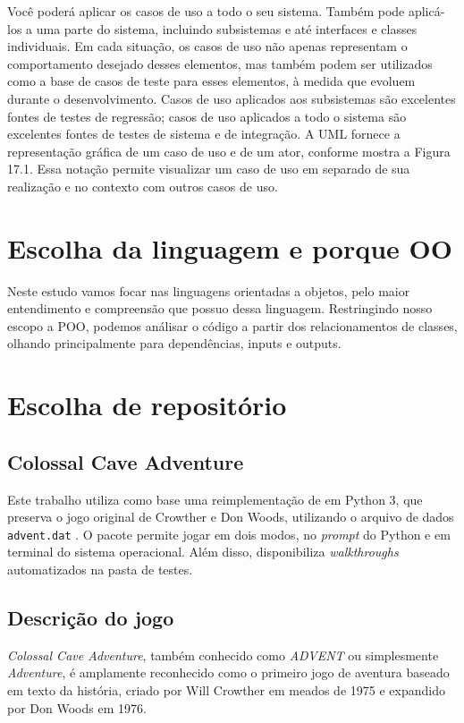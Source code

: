 \documentclass[12pt,a4paper]{article}
\begin{document}
Você poderá aplicar os casos de uso a todo o seu sistema. Também pode
aplicá-los a uma parte do sistema, incluindo subsistemas e até interfaces e classes
individuais. Em cada situação, os casos de uso não apenas representam o comportamento desejado desses elementos, mas também podem ser utilizados como
a base de casos de teste para esses elementos, à medida que evoluem durante o
desenvolvimento. Casos de uso aplicados aos subsistemas são excelentes fontes
de testes de regressão; casos de uso aplicados a todo o sistema são excelentes
fontes de testes de sistema e de integração. A UML fornece a representação gráfica de um caso de uso e de um ator, conforme mostra a Figura 17.1. Essa notação permite visualizar um caso de uso em separado de sua realização e no contexto com outros casos de uso.

\section{Escolha da linguagem e porque OO}
Neste estudo vamos focar nas linguagens orientadas a objetos, pelo maior entendimento e compreensão que possuo dessa linguagem. Restringindo nosso escopo a POO, podemos análisar o código a partir dos relacionamentos de classes, olhando principalmente para dependências, inputs e outputs. 

\section{Escolha de repositório}

\subsection{Colossal Cave Adventure}
Este trabalho utiliza como base uma reimplementação de \textcite{rhodes_adventure_py} em Python 3, que preserva o jogo original de Crowther e Don Woods, utilizando o arquivo de dados \texttt{advent.dat} \textcite{adventure_original_sources}. O pacote permite jogar em dois modos, no \emph{prompt} do Python e em terminal do sistema operacional. Além disso, disponibiliza \textit{walkthroughs} automatizados na pasta de testes.

\subsection{Descrição do jogo}

\textit{Colossal Cave Adventure}, também conhecido como \textit{ADVENT} ou simplesmente \textit{Adventure}, é amplamente reconhecido como o primeiro jogo de aventura baseado em texto da história, criado por Will Crowther em meados de 1975 e expandido por Don Woods em 1976. 
\end{document}
